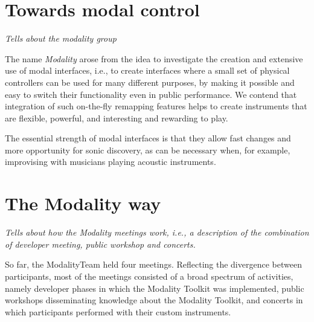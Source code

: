 \documentclass{article}
\begin{document}
\section{Towards modal control}
\label{sec:modal_control}

\emph{Tells about the modality group}

The name \emph{Modality} arose from the idea to investigate the creation and extensive use of modal interfaces, i.e., to create interfaces where a small set of physical controllers can be used for many different purposes, by making it possible and easy to switch their functionality even in public performance. 
We contend that integration of such on-the-fly remapping features helps to create instruments that are flexible, powerful, and interesting and rewarding to play. 

The essential strength of modal interfaces is that they allow fast changes and more opportunity for sonic discovery, as can be necessary when, for example, improvising with musicians playing acoustic instruments. 


\section{The Modality way}
\label{sub:the_modality_way}

\emph{Tells about how the Modality meetings work, i.e., a description of the combination of developer meeting, public workshop and concerts.}

So far, the ModalityTeam held four meetings.
Reflecting the divergence between participants, most of the meetings consisted of a broad spectrum of activities, namely developer phases in which the Modality Toolkit was implemented, public workshops disseminating knowledge about the Modality Toolkit, and concerts in which participants performed with their custom instruments.
\end{document}

